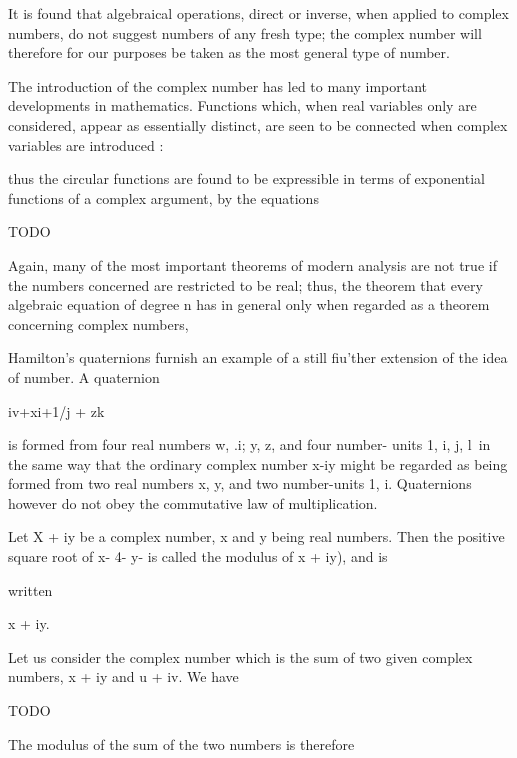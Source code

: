 It is found that algebraical operations, direct or inverse, when
applied to complex numbers, do not suggest numbers of any fresh type;
the complex number will therefore for our purposes be taken as the
most general type of number.

The introduction of the complex number has led to many important
developments in mathematics. Functions which, when real variables only
are considered, appear as essentially distinct, are seen to be
connected when complex variables are introduced :

%
%

thus the circular functions are found to be expressible in terms of
exponential functions of a complex argument, by the equations

TODO

Again, many of the most important theorems of modern analysis are not
true if the numbers concerned are restricted to be real; thus, the
theorem that every algebraic equation of degree n has %
in general only when regarded as a theorem concerning complex numbers,

Hamilton's quaternions furnish an example of a still fiu'ther
extension of the idea of number. A quaternion

iv+xi+1/j + zk

is formed from four real numbers w, .i; y, z, and four number- units
1, i, j, l\ in the same way that the ordinary complex number x-\-iy
might be regarded as being formed from two real numbers x, y, and two
number-units 1, i. Quaternions however do not obey the commutative law
of multiplication.


Let X + iy be a complex number, x and y being real numbers. Then the
positive square root of x- 4- y- is called the modulus of x + iy), and
is

written

x + iy.

Let us consider the complex number which is the sum of two given
complex numbers, x + iy and u + iv. We have

TODO

The modulus of the sum of the two numbers is therefore

